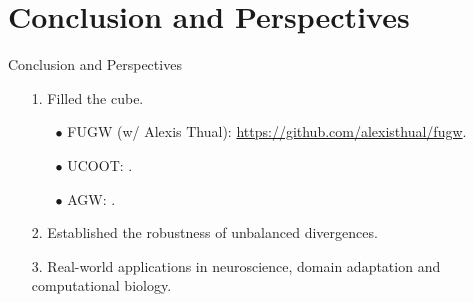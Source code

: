 \documentclass{beamer}
\begin{document}
\section{Conclusion and Perspectives}
\begin{frame}{Conclusion and Perspectives}
\scriptsize

{}
\begin{enumerate}
  \item[1.] Filled the cube.
  \begin{itemize}
    \setlength\itemindent{5pt}
    \scriptsize
    \item[$\bullet$] FUGW (w/ Alexis Thual): \url{https://github.com/alexisthual/fugw}.
    \item[$\bullet$] UCOOT: \url{}.
    \item[$\bullet$] AGW: \url{}.
  \end{itemize}
  \item[2.] Established the robustness of unbalanced divergences.
  \item[3.] Real-world applications in neuroscience, domain adaptation and computational biology.
\end{enumerate}


\end{frame}
\end{document}
